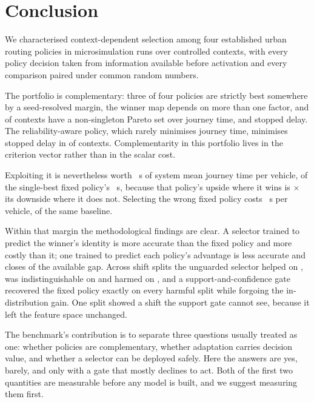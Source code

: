 \section{Conclusion}

We characterised context-dependent selection among four established urban
routing policies in \NumRunsMain{} microsimulation runs over \NumContexts{}
controlled contexts, with every policy decision taken from information available
before activation and every comparison paired under common random numbers.

The portfolio is complementary: three of four policies are strictly best
somewhere by a seed-resolved margin, the winner map depends on more than one
factor, and \NumParetoNonSingleton{} of contexts have a non-singleton Pareto set
over journey time, \CO{} and stopped delay. The reliability-aware policy, which
rarely minimises journey time, minimises stopped delay in \NumSpecCThreePct{} of
contexts. Complementarity in this portfolio lives in the criterion vector rather
than in the scalar cost.

Exploiting it is nevertheless worth \NumHeadroom~s of system mean journey time
per vehicle, \NumHeadroomPct{} of the single-best fixed policy's
\NumSBSMeanCost~s, because that policy's upside where it wins is
\NumAsymRatio$\times$ its downside where it does not. Selecting the wrong fixed
policy costs \NumFixedPenAbsPOne~s per vehicle, \NumFixedPenPctAbsPOne{} of the
same baseline.

Within that margin the methodological findings are clear. A selector trained to
predict the winner's identity is more accurate than the fixed policy and more
costly than it; one trained to predict each policy's advantage is less accurate
and closes \NumBFourGapClosed{} of the available gap. Across
\NumOODNTotal{} shift splits the unguarded selector helped on \NumOODNHelps{},
was indistinguishable on \NumOODNNeutral{} and harmed on \NumOODNHarms{}, and a
support-and-confidence gate recovered the fixed policy exactly on every harmful
split while forgoing the in-distribution gain. One split showed a shift the
support gate cannot see, because it left the feature space unchanged.

The benchmark's contribution is to separate three questions usually treated as
one: whether policies are complementary, whether adaptation carries decision
value, and whether a selector can be deployed safely. Here the answers are yes,
barely, and only with a gate that mostly declines to act. Both of the first two
quantities are measurable before any model is built, and we suggest measuring
them first.
